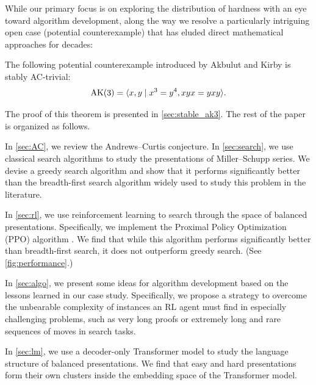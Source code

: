 While our primary focus is on exploring the distribution of hardness with an eye toward algorithm development, along the way we resolve a particularly intriguing open case (potential counterexample) that has eluded direct mathematical approaches for decades:

\begin{theorem}\label{thm:stableAK3}
    The following potential counterexample introduced by Akbulut and Kirby \cite{Akbulut--Kirby} is stably AC-trivial:
    \[
    \text{AK}(3) = \langle x, y \mid x^3 = y^{4}, xyx = yxy\rangle.
    \]
\end{theorem}

\noindent
The proof of this theorem is presented in \autoref{sec:stable_ak3}.
%
The rest of the paper is organized as follows.


In \autoref{sec:AC}, we review the Andrews--Curtis conjecture. In \autoref{sec:search}, we use classical search algorithms to study the presentations of Miller--Schupp series. We devise a greedy search algorithm and show that it performs significantly better than the breadth-first search algorithm widely used to study this problem in the literature.

In \autoref{sec:rl}, we use reinforcement learning to search through the space of balanced presentations. Specifically, we implement the Proximal Policy Optimization (PPO) algorithm \cite{schulman2017proximal}. We find that while this algorithm performs significantly better than breadth-first search, it does not outperform greedy search. (See \autoref{fig:performance}.)

In \autoref{sec:algo}, we present some ideas for algorithm development based on the lessons learned in our case study. Specifically, we propose a strategy to overcome the unbearable complexity of instances an RL agent must find in especially challenging problems, such as very long proofs or extremely long and rare sequences of moves in search tasks.

In \autoref{sec:lm}, we use a decoder-only Transformer model to study the language structure of balanced presentations. We find that easy and hard presentations form their own clusters inside the embedding space of the Transformer model.

